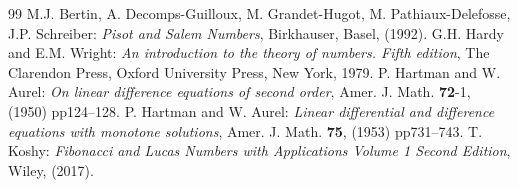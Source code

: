 \documentclass[a4paper,11pt,reqno]{amsart}
\theoremstyle{plain}
\theoremstyle{definition}
\begin{document}
\begin{thebibliography}{99}
{M.J. Bertin, A. Decomps-Guilloux, M. Grandet-Hugot, M. Pathiaux-Delefosse, J.P. Schreiber}: 
{\em Pisot and Salem Numbers}, 
Birkhauser, Basel, (1992).
  {G.H. Hardy and E.M. Wright}: 
  {\em An introduction to the theory of numbers. Fifth edition},
  The Clarendon Press, Oxford University Press, New York, 1979.
{P. Hartman and W. Aurel}: 
{\em On linear difference equations of second order}, 
Amer. J. Math. {\bf{72}}-1, (1950) pp124--128. 
{P. Hartman and W. Aurel}: 
{\em Linear differential and difference equations with monotone solutions}, 
Amer. J. Math. {\bf{75}}, (1953) pp731--743.
{T. Koshy}: 
{\em Fibonacci and Lucas Numbers with Applications Volume 1 Second Edition}, 
Wiley, (2017).
\end{thebibliography}
\end{document}
